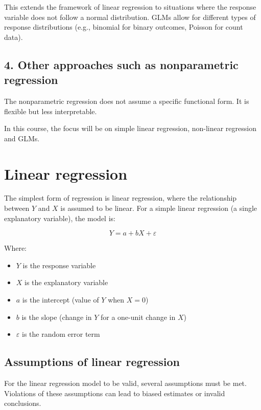 \documentclass[
]{book}
\providecommand{\tightlist}{%
  \setlength{\itemsep}{0pt}\setlength{\parskip}{0pt}}
\begin{document}
This extends the framework of linear regression to situations where the response variable does not follow a normal distribution. GLMs allow for different types of response distributions (e.g., binomial for binary outcomes, Poisson for count data).

\subsection{4. Other approaches such as nonparametric regression}\label{other-approaches-such-as-nonparametric-regression}

The nonparametric regression does not assume a specific functional form. It is flexible but less interpretable.

In this course, the focus will be on simple linear regression, non-linear regression and GLMs.

\section{Linear regression}\label{linear-regression-1}

The simplest form of regression is linear regression, where the relationship between \(Y\) and \(X\) is assumed to be linear. For a simple linear regression (a single explanatory variable), the model is:

\[Y = a + bX + \varepsilon\]

Where:

\begin{itemize}
\tightlist
\item
  \(Y\) is the response variable
\item
  \(X\) is the explanatory variable
\item
  \(a\) is the intercept (value of \(Y\) when \(X = 0\))
\item
  \(b\) is the slope (change in \(Y\) for a one-unit change in \(X\))
\item
  \(\varepsilon\) is the random error term
\end{itemize}

\subsection{Assumptions of linear regression}\label{assumptions-of-linear-regression}

For the linear regression model to be valid, several assumptions must be met. Violations of these assumptions can lead to biased estimates or invalid conclusions.
\end{document}
